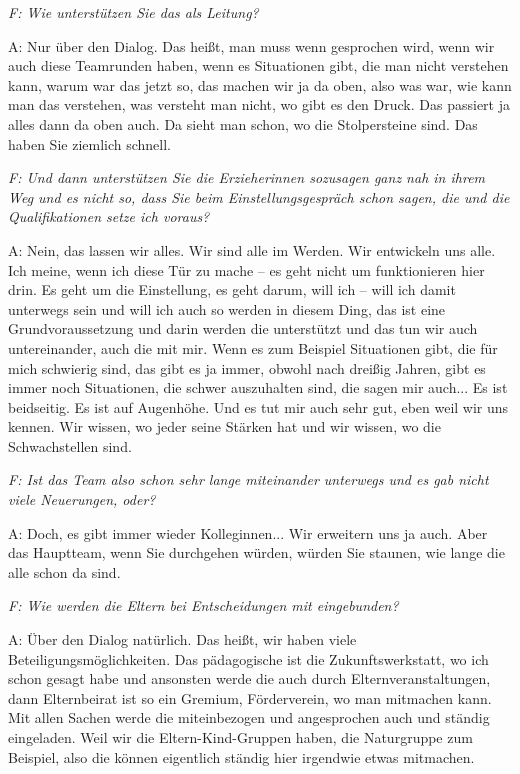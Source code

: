 \begin{linenumbers}
\emph{F: Wie unterstützen Sie das als Leitung?}

A: Nur über den Dialog. Das heißt, man muss wenn gesprochen wird, wenn wir auch diese Teamrunden haben, wenn es Situationen gibt, die man nicht verstehen kann, warum war das jetzt so, das machen wir ja da oben, also was war, wie kann man das verstehen, was versteht man nicht, wo gibt es den Druck. Das passiert ja alles dann da oben auch. Da sieht man schon, wo die Stolpersteine sind. Das haben Sie ziemlich schnell. 

\emph{F: Und dann unterstützen Sie die Erzieherinnen sozusagen ganz nah in ihrem Weg und es nicht so, dass Sie beim Einstellungsgespräch schon sagen, die und die Qualifikationen setze ich voraus?}

A: Nein, das lassen wir alles. Wir sind alle im Werden. Wir entwickeln uns alle. Ich meine, wenn ich diese Tür zu mache -- es geht nicht um funktionieren hier drin. Es geht um die Einstellung, es geht darum, will ich -- will ich damit unterwegs sein und will ich auch so werden in diesem Ding, das ist eine Grundvoraussetzung und darin werden die unterstützt und das tun wir auch untereinander, auch die mit mir. 
Wenn es zum Beispiel Situationen gibt, die für mich schwierig sind, das gibt es ja immer, obwohl nach dreißig Jahren, gibt es immer noch Situationen, die schwer auszuhalten sind, die sagen mir auch... Es ist beidseitig. Es ist auf Augenhöhe. Und es tut mir auch sehr gut, eben weil wir uns kennen. Wir wissen, wo jeder seine Stärken hat und wir wissen, wo die Schwachstellen sind. 

\emph{F: Ist das Team also schon sehr lange miteinander unterwegs und es gab nicht viele Neuerungen, oder?}
 
A: Doch, es gibt immer wieder Kolleginnen... Wir erweitern uns ja auch. Aber das Hauptteam, wenn Sie durchgehen würden, würden Sie staunen, wie lange die alle schon da sind.   

\emph{F: Wie werden die Eltern bei Entscheidungen mit eingebunden?}

A: Über den Dialog natürlich. Das heißt, wir haben viele Beteiligungsmöglichkeiten. Das pädagogische ist die Zukunftswerkstatt, wo ich schon gesagt habe und ansonsten werde die auch durch Elternveranstaltungen, dann Elternbeirat ist so ein Gremium, Förderverein, wo man mitmachen kann. Mit allen Sachen werde die miteinbezogen und angesprochen auch und ständig eingeladen. Weil wir die Eltern-Kind-Gruppen haben, die Naturgruppe zum Beispiel, also die können eigentlich ständig hier irgendwie etwas mitmachen. 


\end{linenumbers}
